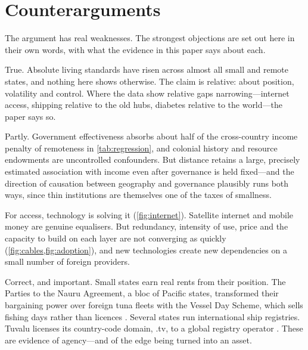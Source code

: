 \section{Counterarguments}
\label{sec:counter}

The argument has real weaknesses. The strongest objections are set out here
in their own words, with what the evidence in this paper says about each.

\begin{counterpoint}
True. Absolute living standards have risen across almost all small and remote
states, and nothing here shows otherwise. The claim is relative: about
position, volatility and control. Where the data show relative gaps
narrowing---internet access, shipping relative to the old hubs, diabetes
relative to the world---the paper says so.
\end{counterpoint}

\begin{counterpoint}
Partly. Government effectiveness absorbs about half of the cross-country
income penalty of remoteness in \cref{tab:regression}, and colonial history
and resource endowments are uncontrolled confounders. But distance retains a
large, precisely estimated association with income even after governance is
held fixed---and the direction of causation between geography and governance
plausibly runs both ways, since thin institutions are themselves one of the
taxes of smallness.
\end{counterpoint}

\begin{counterpoint}
For access, technology is solving it (\cref{fig:internet}). Satellite internet
and mobile money are genuine equalisers. But redundancy, intensity of use,
price and the capacity to build on each layer are not converging as quickly
(\cref{fig:cables,fig:adoption}), and new technologies create new
dependencies on a small number of foreign providers.
\end{counterpoint}

\begin{counterpoint}
Correct, and important. Small states earn real rents from their position.
The Parties to the Nauru Agreement, a bloc of Pacific states, transformed their
bargaining power over foreign tuna fleets with the Vessel Day Scheme, which
sells fishing days rather than licences \parencite{aqorau2009}. Several
states run international ship registries. Tuvalu licenses its country-code
domain, .tv, to a global registry operator \parencite{pina2021tv}. These are
evidence of agency---and of the edge being turned into an asset.
\end{counterpoint}

